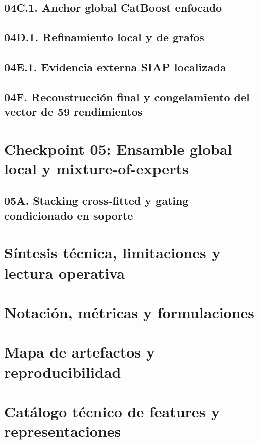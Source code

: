 \documentclass[11pt,oneside]{report}
\begin{document}
\section{04C.1. Anchor global CatBoost enfocado}
\label{sec:checkpoint04c1}

\section{04D.1. Refinamiento local y de grafos}
\label{sec:checkpoint04d1}

\section{04E.1. Evidencia externa SIAP localizada}
\label{sec:checkpoint04e1}

\section{04F. Reconstrucción final y congelamiento del vector de 59 rendimientos}
\label{sec:checkpoint04f}

\chapter{Checkpoint 05: Ensamble global--local y mixture-of-experts}
\label{chap:checkpoint05}
\section{05A. Stacking cross-fitted y gating condicionado en soporte}
\label{sec:checkpoint05a}


\chapter{Síntesis técnica, limitaciones y lectura operativa}
\label{chap:synthesis}

\appendix
\chapter{Notación, métricas y formulaciones}
\label{app:notation}

\chapter{Mapa de artefactos y reproducibilidad}
\label{app:repro}

\chapter{Catálogo técnico de features y representaciones}
\label{app:features}

\end{document}
